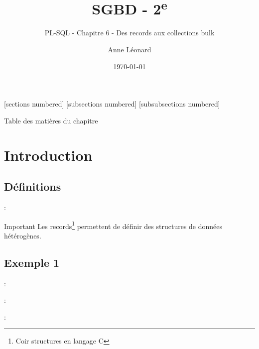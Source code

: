 \documentclass[10pt]{beamer}
\title{SGBD - 2\textsuperscript{e}}
\subtitle{PL-SQL - Chapitre 6 - Des records aux collections bulk}
\date{\today}
\author{Anne Léonard}
\institute{Haute École de la Province de Liège}
\begin{document}
\maketitle

[sections numbered]
[subsections numbered]
[subsubsections numbered]
\begin{frame}[allowframebreaks]{Table des matières du chapitre}
    \tableofcontents[subsectionstyle=show/show/hide,subsubsectionstyle=show/show/hide,]
\end{frame}

\section{Introduction}
\tocss
\subsection{Définitions}
\begin{frame}{\secname : \subsecname}
    \begin{alertblock}{Important}
        Les records\footnote{Coir structures en langage C} permettent de définir des structures de données hétérogènes.
    \end{alertblock}
\end{frame}
\subsection{Exemple 1}

\begin{frame}{\secname : \subsecname}
    
\end{frame}

\begin{frame}{\secname : \subsecname}
    
\end{frame}



\begin{frame}{\secname : \subsecname}
    
\end{frame}
\end{document}
